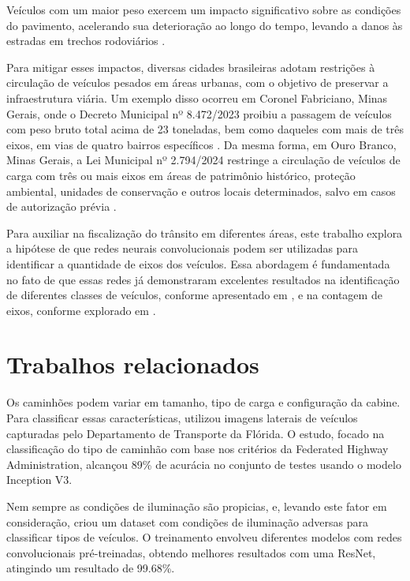 \documentclass[12pt]{article}
\begin{document}
    Veículos com um maior peso exercem um impacto significativo sobre as condições do pavimento, acelerando sua deterioração ao longo do tempo, levando a danos às estradas em trechos rodoviários \cite{damage_on_roads}.
    
    Para mitigar esses impactos, diversas cidades brasileiras adotam restrições à circulação de veículos pesados em áreas urbanas, com o objetivo de preservar a infraestrutura viária. Um exemplo disso ocorreu em Coronel Fabriciano, Minas Gerais, onde o Decreto Municipal nº 8.472/2023 proibiu a passagem de veículos com peso bruto total acima de 23 toneladas, bem como daqueles com mais de três eixos, em vias de quatro bairros específicos \cite{prefeitura_de_coronel_fabriciano}. Da mesma forma, em Ouro Branco, Minas Gerais, a Lei Municipal nº 2.794/2024 restringe a circulação de veículos de carga com três ou mais eixos em áreas de patrimônio histórico, proteção ambiental, unidades de conservação e outros locais determinados, salvo em casos de autorização prévia \cite{lei_ourobranco_2024}.
    
    Para auxiliar na fiscalização do trânsito em diferentes áreas, este trabalho explora a hipótese de que redes neurais convolucionais podem ser utilizadas para identificar a quantidade de eixos dos veículos. Essa abordagem é fundamentada no fato de que essas redes já demonstraram excelentes resultados na identificação de diferentes classes de veículos, conforme apresentado em \cite{iluminacao_adversa}, e na contagem de eixos, conforme explorado em \cite{marcomini2023truckaxledetectionconvolutional}.

\section{Trabalhos relacionados}

    Os caminhões podem variar em tamanho, tipo de carga e configuração da cabine. Para classificar essas características, \cite{Almutairi2022} utilizou imagens laterais de veículos capturadas pelo Departamento de Transporte da Flórida. O estudo, focado na classificação do tipo de caminhão com base nos critérios da Federated Highway Administration, alcançou 89\% de acurácia no conjunto de testes usando o modelo Inception V3.

    Nem sempre as condições de iluminação são propicias, e, levando este fator em consideração, \cite{iluminacao_adversa} criou um dataset com condições de iluminação adversas para classificar tipos de veículos. O treinamento envolveu diferentes modelos com redes convolucionais pré-treinadas, obtendo melhores resultados com uma ResNet, atingindo um resultado de 99.68\%.
\end{document}

